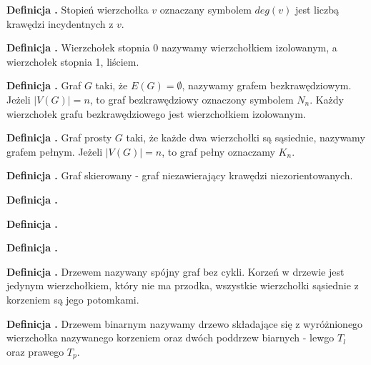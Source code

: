 \noindent
\textbf{Definicja .}
\incrementdefinitionIndex
Stopień wierzchołka $v$ oznaczany symbolem $deg(v)$ jest liczbą krawędzi incydentnych z $v$.

\noindent
\textbf{Definicja .}
\incrementdefinitionIndex
Wierzchołek stopnia 0 nazywamy wierzchołkiem izolowanym, a wierzchołek stopnia 1, liściem.

\noindent
\textbf{Definicja .}
\incrementdefinitionIndex
Graf $G$ taki, że $E(G) = \emptyset$, nazywamy grafem bezkrawędziowym. Jeżeli $|V(G)| = n$, to graf bezkrawędziowy oznaczony symbolem $N_n$.
Każdy wierzchołek grafu bezkrawędziowego jest wierzchołkiem izolowanym.

\noindent
\textbf{Definicja .}
\incrementdefinitionIndex
Graf prosty $G$ taki, że każde dwa wierzchołki są sąsiednie, nazywamy grafem pełnym.
Jeżeli $|V(G)| = n$, to graf pełny oznaczamy $K_n$.

\noindent
\textbf{Definicja .}
\incrementdefinitionIndex
Graf skierowany - graf niezawierający krawędzi niezorientowanych.

\noindent
\textbf{Definicja .}
\incrementdefinitionIndex

\noindent
\textbf{Definicja .}
\incrementdefinitionIndex

\noindent
\textbf{Definicja .}
\incrementdefinitionIndex

\noindent
\textbf{Definicja .}
\incrementdefinitionIndex
Drzewem nazywany spójny graf bez cykli. Korzeń w drzewie jest jedynym wierzchołkiem,
który nie ma przodka, wszystkie wierzchołki sąsiednie z korzeniem są jego potomkami.

\noindent
\textbf{Definicja .}
\incrementdefinitionIndex
Drzewem binarnym nazywamy drzewo składające się z wyróżnionego wierzchołka nazywanego korzeniem oraz dwóch poddrzew biarnych
- lewgo $T_l$ oraz prawego $T_p$.
